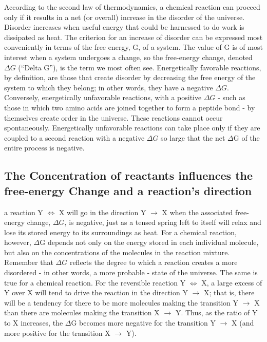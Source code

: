 According to the second law of thermodynamics, a chemical reaction
can proceed only if it results in a net (or overall) increase in the disorder
of the universe. Disorder increases when useful
energy that could be harnessed to do work is dissipated as heat. The
criterion for an increase of disorder can be expressed most conveniently
in terms of the free energy, G, of a system. The value of G is of most
interest when a system undergoes a change, so the free-energy change,
denoted \textbf{$\Delta G$} (“Delta G”), is the term we most often see.
Energetically favorable reactions, by definition, are those that create disorder
by decreasing the free energy of the system to which they belong; in
other words, they have a negative $\Delta G$. Conversely, energetically unfavorable reactions, with a positive
$\Delta G$ - such as those in which two amino acids are joined together to form
a peptide bond - by themselves create order in the universe. These reactions
cannot occur spontaneously. Energetically unfavorable reactions
can take place only if they are coupled to a second reaction with a negative
$\Delta G$ so large that the net $\Delta$G of the entire process is negative.

\subsection{The Concentration of reactants influences the free-energy Change and a reaction’s direction}

a reaction Y $\Longleftrightarrow$ X will go in the direction Y $\rightarrow$ X
when the associated free-energy change, $\Delta G$, is negative, just as a tensed
spring left to itself will relax and lose its stored energy to its surroundings
as heat. For a chemical reaction, however, $\Delta$G depends not only on the
energy stored in each individual molecule, but also on the concentrations
of the molecules in the reaction mixture. Remember that $\Delta G$ reflects the
degree to which a reaction creates a more disordered - in other words, a
more probable - state of the universe.
The same is true for a chemical reaction. For the reversible reaction Y $\Longleftrightarrow$
X, a large excess of Y over X will tend to drive the reaction in the direction
Y $\rightarrow$ X; that is, there will be a tendency for there to be more molecules
making the transition Y $\rightarrow$ X than there are molecules making the transition
X $\rightarrow$ Y. Thus, as the ratio of Y to X increases, the $\Delta$G becomes more negative
for the transition Y $\rightarrow$ X (and more positive for the transition X $\rightarrow$ Y).

